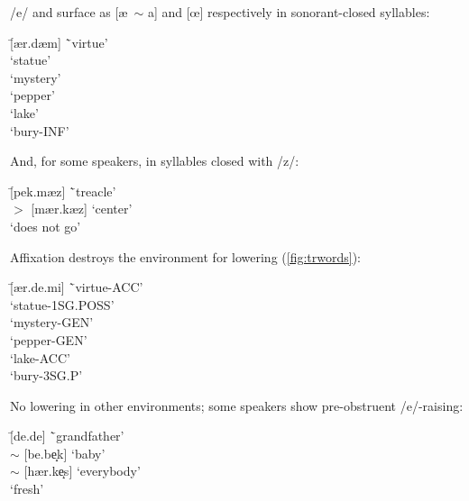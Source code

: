 \begin{example}\label{ex:trson}
/e/ and \ur{\o} surface as [\ae \ $\sim$ a] and [\oe] respectively in sonorant-closed syllables:
  \begin{tabbing}
       \tab[2cm] \= [ær.dæm] \tab[3cm] \=`virtue' \\
        \>`statue' \\
       \> [gi.zæm] \>`mystery' \\
       \> [bi.b\ae r] \>`pepper' \\
       \> [g\oe l] \>`lake'\\
       \> [g\oe m.mek] \>`bury-{\sc\scriptsize INF}'
  \end{tabbing}
\end{example}

\begin{example}\label{ex:trz}
And, for some speakers, in syllables closed with /z/:
  \begin{tabbing}
       \tab[2cm] \= [pek.mæz] \tab[3cm] \=`treacle' \\
        $>$ [mær.kæz] \>`center' \\
        \>`does not go'
  \end{tabbing}
\end{example}

\begin{example}\label{ex:trresyll}
Affixation destroys the environment for lowering (\cref{fig:trwords}):
  \begin{tabbing}
       \tab[2cm] \= [ær.de.mi] \tab[3cm] \=`virtue-{\sc\scriptsize ACC}' \\
        \>`statue-{\sc\scriptsize 1SG.POSS}' \\
       \> [gi.ze.min] \>`mystery-{\sc\scriptsize GEN}'\\
       \> [bi.be.rin] \>`pepper-{\sc\scriptsize GEN}'\\
       \> [g\o .ly] \>`lake-{\sc\scriptsize ACC}'\\
       \> [g\o .m\ae r] \>`bury-{\sc\scriptsize 3SG.P}'
  \end{tabbing}
\end{example}

\begin{example}\label{ex:trother}
No lowering in other environments; some speakers show pre-obstruent /e/-raising:
  \begin{tabbing}
       \tab[2cm] \= [de.de] \tab[3cm] \=`grandfather' \\
       \> [be.bek] $\sim$ [be.be̝k] \>`baby' \\
       \> [h\ae r.kes] $\sim$ [h\ae r.ke̝s] \>`everybody'\\
       \> [ta.ze] \>`fresh'
  \end{tabbing}
\end{example}

